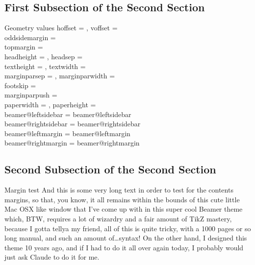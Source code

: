 \documentclass[aspectratio=1610]{beamer}
\begin{document}
\subsection[First Second]{First Subsection of the Second Section}
\begin{frame}[t]{Geometry values}
  hoffset = \the\hoffset, voffset = \the\voffset\\
  oddsidemargin = \the\oddsidemargin\\
  topmargin = \the\topmargin\\
  headheight = \the\headheight, headsep = \the\headsep\\
  textheight = \the\textheight, textwidth = \the\textwidth\\
  marginparsep = \the\marginparsep, marginparwidth = \the\marginparwidth\\
  footskip = \the\footskip\\

  marginparpush = \the\marginparpush\\
  paperwidth = \the\paperwidth, paperheight = \the\paperheight\\

  beamer@leftsidebar = \the\csname beamer@leftsidebar\endcsname\\
  beamer@rightsidebar = \the\csname beamer@rightsidebar\endcsname\\
  beamer@leftmargin = \the\csname beamer@leftmargin\endcsname\\
  beamer@rightmargin = \the\csname beamer@rightmargin\endcsname
\end{frame}

\subsection[Second Second]{Second Subsection of the Second Section}
\begin{frame}[t]{Margin test}
  And this is some very long text in order to test for the contents margins,
  so that, you know, it all remains within the bounds of this cute little Mac
  OSX like window that I've come up with in this super cool Beamer theme
  which, BTW, requires a lot of wizardry and a fair amount of TikZ mastery,
  because I gotta tellya my friend, all of this is quite tricky, with a 1000
  pages or so long manual, and such an amount of\ldots syntax! On the other
  hand, I designed this theme 10 years ago, and if I had to do it all over
  again today, I probably would just ask Claude to do it for me.
\end{frame}
\end{document}
